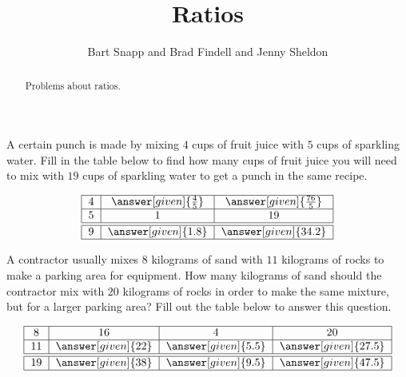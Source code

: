 \documentclass[nooutcomes]{ximera}
\title{Ratios}
\author{Bart Snapp and Brad Findell and Jenny Sheldon}
\begin{document}
\begin{abstract}
Problems about ratios.
\end{abstract}
\maketitle








\begin{problem}
A certain punch is made by mixing $4$ cups of fruit juice with $5$ cups of sparkling water.  Fill in the table below to find how many cups of fruit juice you will need to mix with $19$ cups of sparkling water to get a punch in the same recipe.

\[
\begin{tabular}{|c|c|c|} \hline
4 & $\answer[given]{\frac{4}{5}}$ & $\answer[given]{\frac{76}{5}}$ \\ \hline
5 & 1 & 19 \\ \hline \hline
9 & $\answer[given]{1.8}$ & $\answer[given]{34.2}$ \\ \hline
\end{tabular}
\]
\end{problem}


\begin{problem}
A contractor usually mixes $8$ kilograms of sand with $11$ kilograms of rocks to make a parking area for equipment.  How many kilograms of sand should the contractor mix with $20$ kilograms of rocks in order to make the same mixture, but for a larger parking area?  Fill out the table below to answer this question.

\[
\begin{tabular}{|c|c|c|c|} \hline
8 & 16 & 4 & 20 \\ \hline
11 & $\answer[given]{22}$ & $\answer[given]{5.5}$ & $\answer[given]{27.5}$ \\ \hline \hline
19 & $\answer[given]{38}$ & $\answer[given]{9.5}$ & $\answer[given]{47.5}$ \\ \hline
\end{tabular}
\]
\end{problem}
\end{document}
